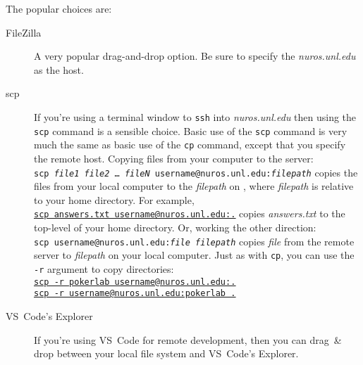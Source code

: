 The popular choices are:
\begin{description}
    \item[FileZilla] A very popular drag-and-drop option.
        Be sure to specify the \textit{nuros.unl.edu} as the host.
    \item[scp] If you're using a terminal window to \texttt{ssh} into \textit{nuros.unl.edu} then using the \texttt{scp} command is a sensible choice.
        Basic use of the \texttt{scp} command is very much the same as basic use of the \texttt{cp} command, except that you specify the remote host.
        Copying files from your computer to the server: \\
        \texttt{scp \textit{file1} \textit{file2} \dots\ \textit{fileN} username@nuros.unl.edu:\textit{filepath}} copies the files from your local computer to the \textit{filepath} on \runtimeenvironment, where \textit{filepath} is relative to your home directory.
        For example, \\
        \underline{\underline{\texttt{scp answers.txt username@nuros.unl.edu:.}}} copies \textit{answers.txt} to the top-level of your home directory.
        Or, working the other direction: \\
        \texttt{scp username@nuros.unl.edu:\textit{file} \textit{filepath}} copies \textit{file} from the remote server to \textit{filepath} on your local computer.
        Just as with \texttt{cp}, you can use the \texttt{-r} argument to copy directories: \\
        \underline{\underline{\texttt{scp -r pokerlab username@nuros.unl.edu:.}}} \\
        \underline{\underline{\texttt{scp -r username@nuros.unl.edu:pokerlab .}}}
    \item[VS~Code's Explorer] If you're using VS~Code for remote development, then you can drag~\& drop between your local file system and VS~Code's Explorer.
\end{description}

